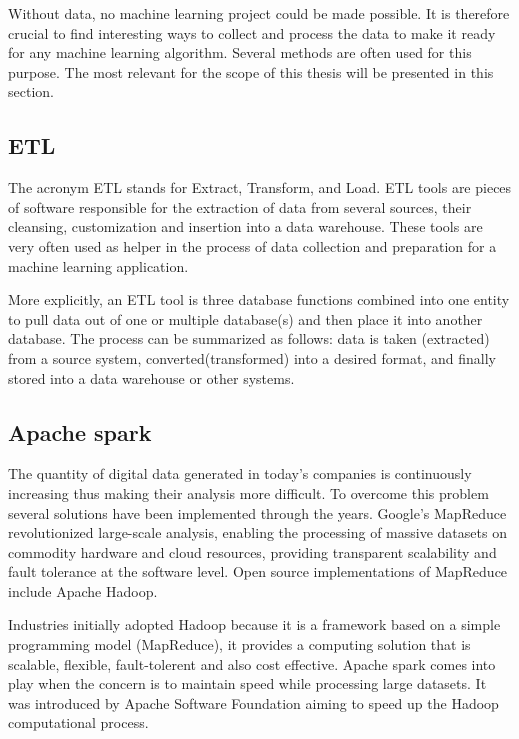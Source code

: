 \documentclass[LaM,binding=0.6cm, english]{sapthesis}
\begin{document}
Without data, no machine learning project could be made possible. It is therefore crucial to find interesting ways to collect and process the data to make it ready for any machine learning algorithm. Several methods are often used for this purpose. The most relevant for the scope of this thesis will be presented in this section. 

\subsection{ETL}

The acronym \gls{ETL} stands for Extract, Transform, and Load. ETL tools are pieces of software responsible for the extraction of data from several sources, their cleansing, customization and insertion into a data warehouse.\cite{Vassiliadis2002} These tools are very often used as helper in the process of data collection and preparation for a machine learning application.

\par More explicitly, an ETL tool is three database functions combined into one entity to pull data out of one or multiple database(s) and then place it into another database. The process can be summarized as follows: data is taken (extracted) from a source system, converted(transformed) into a desired format, and finally stored into a data warehouse or other systems.

\subsection{Apache spark}

The quantity of digital data generated in today's companies is continuously increasing thus making their analysis more difficult. To overcome this problem several solutions have been implemented through the years. Google’s MapReduce revolutionized large-scale analysis, enabling the processing of massive datasets on commodity hardware and cloud resources, providing transparent scalability and fault tolerance at the software level.\cite{Capuccini2017} Open source implementations of MapReduce include Apache Hadoop.

\par Industries initially adopted Hadoop because it is a framework based on a simple programming model (\gls{MapReduce}), it provides a computing solution that is scalable, flexible, fault-tolerent and also cost effective. Apache spark comes into play when the concern is to maintain speed while processing large datasets. It was introduced by Apache Software Foundation aiming to speed up the Hadoop computational process.
\end{document}
